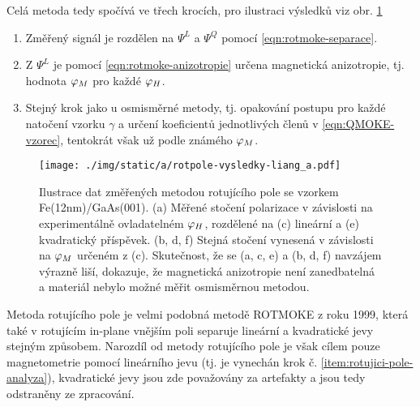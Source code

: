 Celá metoda tedy spočívá ve třech krocích, pro ilustraci výsledků viz obr. \ref{fig:metoda-rotujiciho-pole-vysledky}
\begin{enumerate}
    \item Změřený signál je rozdělen na $\Psi^L$ a $\Psi^Q$ pomocí \eqref{eqn:rotmoke-separace}.
    \item Z $\Psi^L$ je pomocí \eqref{eqn:rotmoke-anizotropie} určena magnetická anizotropie, tj. hodnota $\varphi_M$ pro každé $\varphi_H$.
    \item Stejný krok jako u osmisměrné metody, tj. opakování postupu pro každé natočení vzorku $\gamma$ a určení koeficientů jednotlivých členů v \eqref{eqn:QMOKE-vzorec}, tentokrát však už podle známého $\varphi_M$. \label{item:rotujici-pole-analyza}
\end{enumerate}

\begin{figure}[htbp]
    \centering
    \texttt{[image: ./img/static/a/rotpole-vysledky-liang\_a.pdf]}
    \caption{Ilustrace dat změřených metodou rotujícího pole se vzorkem Fe(12nm)/GaAs(001).
    (a) Měřené stočení polarizace v závislosti na experimentálně ovladatelném $\varphi_H$, rozdělené na (c) lineární a (e) kvadratický příspěvek. (b, d, f) Stejná stočení vynesená v závislosti na $\varphi_M$ určeném z (c). 
    Skutečnost, že se (a, c, e) a (b, d, f) navzájem výrazně liší, dokazuje, že magnetická anizotropie není zanedbatelná a materiál nebylo možné měřit osmisměrnou metodou. \cite{liangSeparationLinearQuadratic2015}}
    \label{fig:metoda-rotujiciho-pole-vysledky}
\end{figure}

Metoda rotujícího pole je velmi podobná metodě ROTMOKE\cite{mattheisDeterminationAnisotropyField1999} z roku 1999, která také v rotujícím in-plane vnějším poli separuje lineární a kvadratické jevy stejným způsobem.
Narozdíl od metody rotujícího pole je však cílem pouze magnetometrie pomocí lineárního jevu (tj. je vynechán krok č. \ref{item:rotujici-pole-analyza}), kvadratické jevy jsou zde považovány za artefakty a jsou tedy odstraněny ze zpracování.
